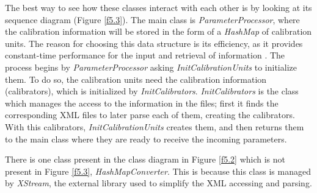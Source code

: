 The best way to see how these classes interact with each other is by looking at its sequence diagram (Figure \ref{f5.3}). The main class is \emph{ParameterProcessor}, where the calibration information will be stored in the form of a \emph{HashMap} of calibration units. The reason for choosing this data structure is its efficiency, as it provides constant-time performance for the input and retrieval of information \cite{HashMap}. The process begins by \emph{ParameterProcessor} asking \emph{InitCalibrationUnits} to initialize them. To do so, the calibration units need the calibration information (calibrators), which is initialized  by \emph{InitCalibrators}. \emph{InitCalibrators} is the class which manages the access to the information in the files; first it finds the corresponding XML files to later parse each of them, creating the calibrators. With this calibrators, \emph{InitCalibrationUnits} creates them, and then returns them to the main class where they are ready to receive the incoming parameters.

There is one class present in the class diagram in Figure \ref{f5.2} which is not present in Figure \ref{f5.3}, \emph{HashMapConverter}. This is because this class is managed by \emph{XStream}, the external library used to simplify the XML accessing and parsing. 


